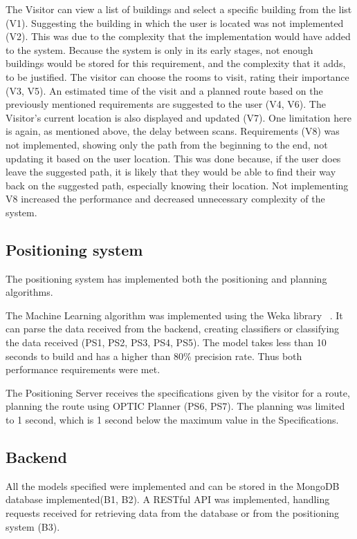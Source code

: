 The Visitor can view a list of buildings and select a specific building from the list (V1). Suggesting the building in which the user is located was not implemented (V2). This was due to the complexity that the implementation would have added to the system. Because the system is only in its early stages, not enough buildings would be stored for this requirement, and the complexity that it adds, to be justified. The visitor can choose the rooms to visit, rating their importance (V3, V5). An estimated time of the visit and a planned route based on the previously mentioned requirements are suggested to the user (V4, V6). The Visitor's current location is also displayed and updated (V7). One limitation here is again, as mentioned above, the delay between scans. Requirements (V8) was not implemented, showing only the path from the beginning to the end, not updating it based on the user location. This was done because, if the user does leave the suggested path, it is likely that they would be able to find their way back on the suggested path, especially knowing their location. Not implementing V8 increased the performance and decreased unnecessary complexity of the system.

\subsection{Positioning system}
The positioning system has implemented both the positioning and planning algorithms. 

The Machine Learning algorithm was implemented using the Weka library ~\cite{Weka}. It can parse the data received from the backend, creating classifiers or classifying the data received (PS1, PS2, PS3, PS4, PS5). The model takes less than 10 seconds to build and has a higher than 80\% precision rate. Thus both performance requirements were met.

The Positioning Server receives the specifications given by the visitor for a route, planning the route using OPTIC Planner (PS6, PS7). The planning was limited to 1 second, which is 1 second below the maximum value in the Specifications.

\subsection{Backend}
All the models specified were implemented and can be stored in the MongoDB database implemented(B1, B2). A RESTful API was implemented, handling requests received for retrieving data from the database or from the positioning system (B3).     




 

